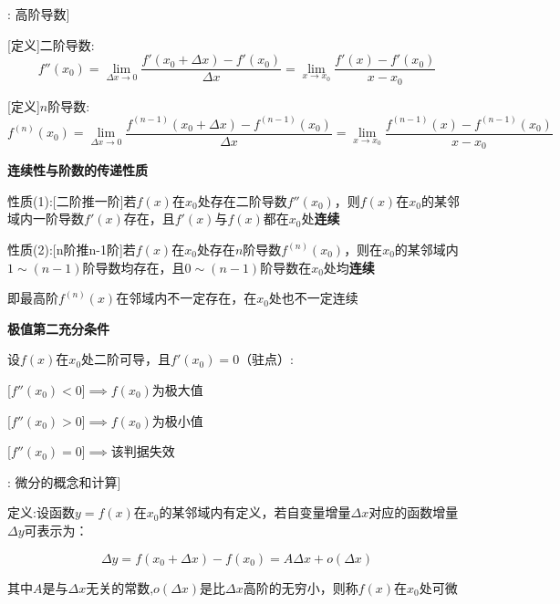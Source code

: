 \documentclass[11pt,a4paper,UTF8]{ctexart}
\begin{document}
\begin{thmbox}[原理[6]: 高阶导数]

[定义]二阶导数:	
\begin{equation*}
f''(x_0) = \lim_{\Delta x \to 0} \frac{f'(x_0 + \Delta x) - f'(x_0)}{\Delta x} = \lim_{x \to x_0} \frac{f'(x) - f'(x_0)}{x - x_0}
\end{equation*}


[定义]$n$阶导数:	
\begin{equation*}
f^{(n)}(x_0) = \lim_{\Delta x \to 0} \frac{f^{(n-1)}(x_0 + \Delta x) - f^{(n-1)}(x_0)}{\Delta x} = \lim_{x \to x_0} \frac{f^{(n-1)}(x) - f^{(n-1)}(x_0)}{x - x_0}
\end{equation*}


\textbf{连续性与阶数的传递性质}

性质(1):[二阶推一阶]若$f(x)$在$x_0$处存在二阶导数$f''(x_0)$，则$f(x)$在$x_0$的某邻域内一阶导数$f'(x)$存在，且$f'(x)$与$f(x)$都在$x_0$处\textbf{连续}

性质(2):[n阶推n-1阶]若$f(x)$在$x_0$处存在$n$阶导数$f^{(n)}(x_0)$，则在$x_0$的某邻域内$1 \sim (n-1)$阶导数均存在，且$0 \sim (n-1)$阶导数在$x_0$处均\textbf{连续}

  即最高阶$f^{(n)}(x)$在邻域内不一定存在，在$x_0$处也不一定连续

\textbf{极值第二充分条件}

设$f(x)$在$x_0$处二阶可导，且$f'(x_0) = 0$（驻点）:

  [$f''(x_0) < 0$]$\implies f(x_0)$为极大值

  [$f''(x_0) > 0$]$\implies f(x_0)$为极小值

  [$f''(x_0) = 0$]$\implies$该判据失效

\end{thmbox}
\begin{thmbox}[原理[7]: 微分的概念和计算]

定义:设函数$y = f(x)$在$x_0$的某邻域内有定义，若自变量增量$\Delta x$对应的函数增量$\Delta y$可表示为：

\end{thmbox}

\begin{equation*}
\Delta y = f(x_0 + \Delta x) - f(x_0) = A \Delta x + o(\Delta x)
\end{equation*}

\begin{solbox}[分步推导与答题规范]
  其中$A$是与$\Delta x$无关的常数,$o(\Delta x)$是比$\Delta x$高阶的无穷小，则称$f(x)$在$x_0$处可微
\end{solbox}
\end{document}
